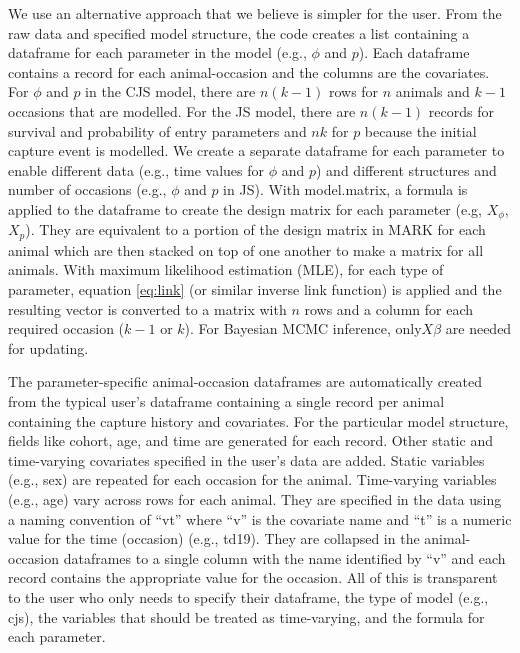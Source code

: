 \documentclass[12pt]{article}
\begin{document}
We use an alternative approach that we believe is simpler for the
user. From the raw data and specified model structure, the code creates
a list containing a dataframe for each parameter in the model (e.g.,
$\phi$ and $p$). Each dataframe contains a record for each animal-occasion
and the columns are the covariates. For $\phi$ and $p$ in the CJS
model, there are $n(k-1)$ rows for $n$ animals and $k-1$ occasions
that are modelled. For the JS model, there are $n(k-1)$ records for
survival and probability of entry parameters and $nk$ for $p$ because
the initial capture event is modelled. We create a separate dataframe
for each parameter to enable different data (e.g., time values for
$\phi$ and $p$) and different structures and number of occasions
(e.g., $\phi$ and $p$ in JS). With model.matrix, a formula is applied
to the dataframe to create the design matrix for each parameter (e.g,
$X_{\phi}$,$X_{p}$). They are equivalent to a portion of the design
matrix in MARK for each animal which are then stacked on top of one
another to make a matrix for all animals. With maximum likelihood
estimation (MLE), for each type of parameter, equation \ref{eq:link}
(or similar inverse link function) is applied and the resulting vector
is converted to a matrix with $n$ rows and a column for each required
occasion ($k-1$ or $k$). For Bayesian MCMC inference, only$X\beta$
are needed for updating.

The parameter-specific animal-occasion dataframes are automatically
created from the typical user's dataframe containing a single record
per animal containing the capture history and covariates. For the
particular model structure, fields like cohort, age, and time are
generated for each record. Other static and time-varying covariates
specified in the user's data are added. Static variables (e.g., sex)
are repeated for each occasion for the animal. Time-varying variables
(e.g., age) vary across rows for each animal. They are specified in
the data using a naming convention of ``vt'' where ``v'' is the
covariate name and ``t'' is a numeric value for the time (occasion)
(e.g., td19). They are collapsed in the animal-occasion dataframes
to a single column with the name identified by ``v'' and each record
contains the appropriate value for the occasion. All of this is transparent
to the user who only needs to specify their dataframe, the type of
model (e.g., cjs), the variables that should be treated as time-varying,
and the formula for each parameter.
\end{document}
